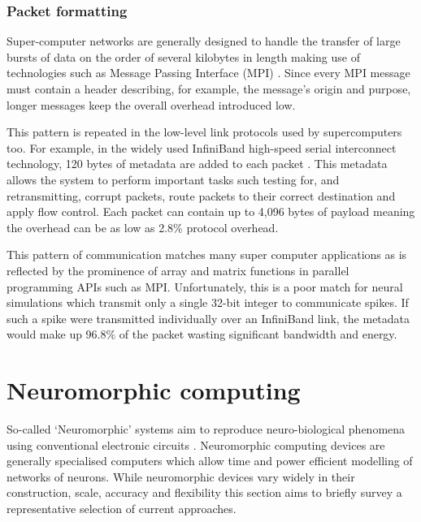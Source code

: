 			
			\subsubsection{Packet formatting}
				
				Super-computer networks are generally designed to handle the transfer of
				large bursts of data on the order of several kilobytes in length making
				use of technologies such as Message Passing Interface (MPI)
				\cite{mpiforum12}. Since every MPI message must contain a header
				describing, for example, the message's origin and purpose, longer
				messages keep the overall overhead introduced low.
				
				This pattern is repeated in the low-level link protocols used by
				supercomputers too.  For example, in the widely used InfiniBand
				high-speed serial interconnect technology, 120 bytes of metadata are
				added to each packet \cite{infinibandta08}. This metadata allows the
				system to perform important tasks such testing for, and retransmitting,
				corrupt packets, route packets to their correct destination and apply
				flow control. Each packet can contain up to 4,096 bytes of payload
				meaning the overhead can be as low as 2.8\% protocol overhead.
				
				This pattern of communication matches many super computer applications
				as is reflected by the prominence of array and matrix functions in
				parallel programming APIs such as MPI. Unfortunately, this is a poor
				match for neural simulations which transmit only a single 32-bit integer
				to communicate spikes. If such a spike were transmitted individually
				over an InfiniBand link, the metadata would make up 96.8\% of the packet
				wasting significant bandwidth and energy.
				
	
	
	\section{Neuromorphic computing}
		
		So-called `Neuromorphic' systems aim to reproduce neuro-biological phenomena
		using conventional electronic circuits \cite{mead90}. Neuromorphic computing
		devices are generally specialised computers which allow time and power
		efficient modelling of networks of neurons. While neuromorphic devices vary
		widely in their construction, scale, accuracy and flexibility this section
		aims to briefly survey a representative selection of current approaches.
		
